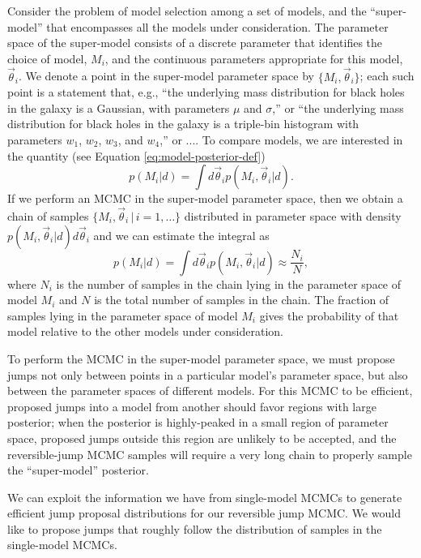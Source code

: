 \documentclass[prd,preprint]{revtex4}
\newcommand{\vtheta}{\vec{\theta}}
\begin{document}
Consider the problem of model selection among a set of models, and the
``super-model'' that encompasses all the models under consideration.
The parameter space of the super-model consists of a discrete
parameter that identifies the choice of model, $M_i$, and the
continuous parameters appropriate for this model, $\vtheta_i$.  We
denote a point in the super-model parameter space by $\{M_i,
\vtheta_i\}$; each such point is a statement that, e.g., ``the
underlying mass distribution for black holes in the galaxy is a
Gaussian, with parameters $\mu$ and $\sigma$,'' or ``the underlying
mass distribution for black holes in the galaxy is a triple-bin
histogram with parameters $w_1$, $w_2$, $w_3$, and $w_4$,'' or ....
To compare models, we are interested in the quantity (see Equation
\eqref{eq:model-posterior-def})
\begin{equation}
  p(M_i|d) = \int d\vtheta_i p(M_i, \vtheta_i|d).
\end{equation}
If we perform an MCMC in the super-model parameter space, then we
obtain a chain of samples $\{M_i, \vtheta_i \, | \, i = 1, \ldots\}$
distributed in parameter space with density $p(M_i,\vtheta_i|d)
d\vtheta_i$ and we can estimate the integral as
\begin{equation}
    p(M_i|d) = \int d\vtheta_i p(M_i, \vtheta_i|d) \approx \frac{N_i}{N},
\end{equation}
where $N_i$ is the number of samples in the chain lying in the
parameter space of model $M_i$ and $N$ is the total number of samples
in the chain.  The fraction of samples lying in the parameter space of
model $M_i$ gives the probability of that model relative to the other
models under consideration.

To perform the MCMC in the super-model parameter space, we must
propose jumps not only between points in a particular model's
parameter space, but also between the parameter spaces of different
models.  For this MCMC to be efficient, proposed jumps into a model
from another should favor regions with large posterior; when the
posterior is highly-peaked in a small region of parameter space,
proposed jumps outside this region are unlikely to be accepted, and
the reversible-jump MCMC samples will require a very long chain to
properly sample the ``super-model'' posterior.

We can exploit the information we have from single-model MCMCs to
generate efficient jump proposal distributions for our reversible jump
MCMC.  We would like to propose jumps that roughly follow the
distribution of samples in the single-model MCMCs. 
\end{document}
